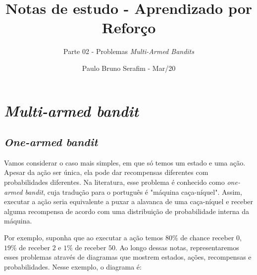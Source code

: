 \documentclass{article}
\title{Notas de estudo - Aprendizado por Reforço}
\author{Parte 02 - Problemas \emph{Multi-Armed Bandits}}
\date{Paulo Bruno Serafim - Mar/20}
\begin{document}
\maketitle

    \section{\textit{Multi-armed bandit}}
    
        \subsection{\emph{One-armed bandit}}
        
            Vamos considerar o caso mais simples, em que só temos um estado e uma ação. Apesar da ação ser única, ela pode dar recompensas diferentes com probabilidades diferentes. Na literatura, esse problema é conhecido como \emph{one-armed bandit}, cuja tradução para o português é "máquina caça-níquel". Assim, executar a ação seria equivalente a puxar a alavanca de uma caça-níquel e receber alguma recompensa de acordo com uma distribuição de probabilidade interna da máquina.

            Por exemplo, suponha que ao executar a ação temos $80\%$ de chance receber $0$, $19\%$ de receber $2$ e $1\%$ de receber $50$. Ao longo dessas notas, representaremos esses problemas através de diagramas que mostrem estados, ações, recompensas e probabilidades. Nesse exemplo, o diagrama é:
            
            \begin{center}
            \end{center}
\end{document}
